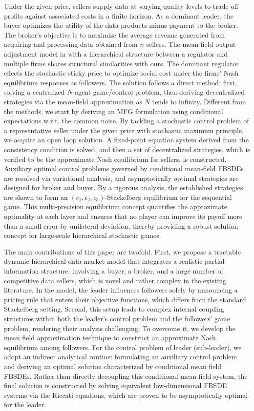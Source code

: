 \documentclass[11pt]{article}
\numberwithin{equation}{section}
\begin{document}
Under the given price, sellers supply data at varying quality levels to trade-off profits against associated costs in a finite horizon. As a dominant leader, the buyer optimizes the utility of the data products minus payment to the broker. The broker's objective is to maximize the average revenue generated from acquiring and processing data obtained from $n$ sellers. The mean-field output adjustment model in \cite{W25} with a hierarchical structure between a regulator and multiple firms shares structural similarities with ours. The dominant regulator effects the stochastic sticky price to optimize social cost under the firms' Nash equilibrium responses as followers. The solution follows a direct method: first, solving a centralized $N$-agent game/control problem, then deriving decentralized strategies via the mean-field approximation as $N$ tends to infinity. Different from the methods, we start by deriving an MFG formulation using conditional expectations w.r.t. the common noise. By tackling a stochastic control problem of a representative seller under the given price with stochastic maximum principle, we acquire an open loop solution. A fixed-point equation system derived from the consistency condition is solved, and then a set of decentralized strategies, which is verified to be the approximate Nash equilibrium for sellers, is constructed. Auxiliary optimal control problems governed by conditional mean-field FBSDEs are resolved via variational analysis, and asymptotically optimal strategies are designed for broker and buyer. By a rigorous analysis, the established strategies are shown to form an $(\epsilon_1, \epsilon_2, \epsilon_3)$-Stackelberg equilibrium for the sequential game. This multi‑precision equilibrium concept quantifies the approximate optimality at each layer and ensures that no player can improve its payoff more than a small error by unilateral deviation, thereby providing a robust solution concept for large‑scale hierarchical stochastic games.
		
The main contributions of this paper are twofold. First, we propose a tractable dynamic hierarchical data market model that integrates a realistic partial information structure, involving a buyer, a broker, and a large number of competitive data sellers, which is novel and rather complex in the existing literature. In the model, the leader influences followers solely by announcing a pricing rule that enters their objective functions, which differs from the standard Stackelberg setting.  Second, this setup leads to complex internal coupling structures within both the leader's control problem and the followers' game problem, rendering their analysis challenging. To overcome it, we develop the mean field approximation technique to construct an approximate Nash equilibrium among followers. For the control problem of leader (sub-leader), we adopt an indirect analytical routine: formulating an auxiliary control problem and deriving an optimal solution characterized by conditional mean field FBSDEs. Rather than directly decoupling this conditional mean-field system, the final solution is constructed by solving equivalent low-dimensional FBSDE systems via the Riccati equations, which are proven to be asymptotically optimal for the leader. 
\end{document}
